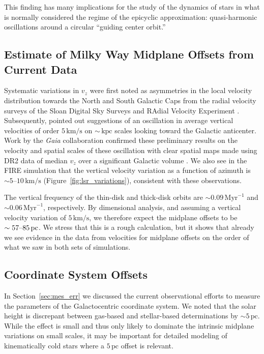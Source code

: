 \documentclass[twocolumn]{aastex62}
\newcommand{\pc}{\text{pc}}
\newcommand{\kpc}{\text{kpc}}
\newcommand{\Myr}{\text{Myr}}
\newcommand{\kms}{\text{km}/\text{s}}
\begin{document}
This finding has many implications for the study of the dynamics of stars in
what is normally considered the regime of the epicyclic approximation:
quasi-harmonic oscillations around a circular ``guiding center orbit.''

\subsection{Estimate of Milky Way Midplane Offsets from Current Data}
\label{ssec:mw_data_midplane}

Systematic variations in $v_z$ were first noted as asymmetries in the local
velocity distribution towards the North and South Galactic Caps from the
radial velocity surveys of the Sloan Digital Sky Surveys
\citep{2012ApJ...750L..41W} and RAdial Velocity Experiment
\citep{2013MNRAS.436..101W}. Subsequently, \citet{2013ApJ...777L...5C} pointed
out suggestions of an oscillation in average vertical velocities of order
$5\,\kms$  on $\sim\,\kpc$ scales looking toward the Galactic anticenter. Work
by the \textit{Gaia} collaboration confirmed these preliminary results on the
velocity and spatial scales of these oscillation with clear spatial maps made
using DR2 data of median $v_z$ over a significant Galactic volume
\citep{2018A&A...616A..11G, 2019arXiv190209569F}. We also see in the FIRE
simulation that the vertical velocity variation as a function of azimuth is
$\sim5\text{--}10\,\kms$ (Figure~\ref{fig:lsr_variations}), consistent with
these observations.

The vertical frequency of the thin-disk and thick-disk orbits are $\sim
0.09\,\Myr^{-1}$ and $\sim0.06\,\Myr^{-1}$, respectively. By dimensional
analysis, and assuming a vertical velocity variation of $5\,\kms$, we
therefore expect the midplane offsets to be $\sim 57\textup{--}85\,\pc$. We
stress that this is a rough calculation, but it shows that already we see
evidence in the data from velocities for midplane offsets on the order of what
we saw in both sets of simulations.

\subsection{Coordinate System Offsets}\label{ssec:coord_off}
In Section~\ref{sec:mes_err} we discussed the current observational efforts to
measure the parameters of the Galactocentric coordinate system. We noted that
the solar height is discrepant between gas-based and stellar-based
determinations by $\sim5\,\pc$. While the effect is small and thus only likely
to dominate the intrinsic midplane variations on small scales, it may be
important for detailed modeling of kinematically cold stars where a $5\,\pc$
offset is relevant.
\end{document}
